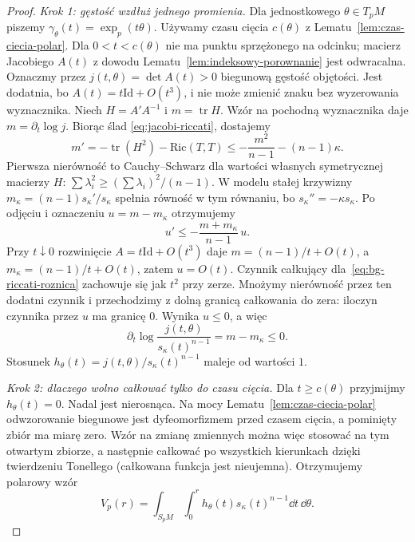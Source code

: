 \begin{proof}
\emph{Krok 1: gęstość wzdłuż jednego promienia.}
Dla jednostkowego $\theta\in T_pM$ piszemy
$\gamma_\theta(t)=\exp_p(t\theta)$.
Używamy czasu cięcia $c(\theta)$ z
Lematu~\ref{lem:czas-ciecia-polar}. Dla $0<t<c(\theta)$ nie ma punktu
sprzężonego na odcinku; macierz Jacobiego
$A(t)$ z dowodu Lematu~\ref{lem:indeksowy-porownanie}
jest odwracalna. Oznaczmy przez
$j(t,\theta)=\det A(t)>0$ biegunową gęstość
objętości. Jest dodatnia, bo
$A(t)=t\mathrm{Id}+O(t^3)$, i nie może zmienić
znaku bez wyzerowania wyznacznika.
Niech $H=A'A^{-1}$ i $m=\operatorname{tr}H$.
Wzór na pochodną wyznacznika daje
$m=\partial_t\log j$. Biorąc ślad
\eqref{eq:jacobi-riccati}, dostajemy
\[
 m'=-\operatorname{tr}(H^2)-\mathrm{Ric}(T,T)
 \leq-\frac{m^2}{n-1}-(n-1)\kappa.
\]
Pierwsza nierówność to Cauchy--Schwarz
dla wartości własnych symetrycznej macierzy $H$:
$\sum\lambda_i^2\geq(\sum\lambda_i)^2/(n-1)$.
W modelu stałej krzywizny
$m_\kappa=(n-1)s_\kappa'/s_\kappa$
spełnia równość w tym równaniu, bo
$s_\kappa''=-\kappa s_\kappa$.
Po odjęciu i oznaczeniu $u=m-m_\kappa$
otrzymujemy
\begin{equation}\label{eq:bg-riccati-roznica}
 u'\leq-\frac{m+m_\kappa}{n-1}\,u.
\end{equation}
Przy $t\downarrow0$ rozwinięcie
$A=t\mathrm{Id}+O(t^3)$ daje
$m=(n-1)/t+O(t)$, a
$m_\kappa=(n-1)/t+O(t)$, zatem $u=O(t)$.
Czynnik całkujący dla~\eqref{eq:bg-riccati-roznica}
zachowuje się jak $t^2$ przy zerze.
Mnożymy nierówność przez ten dodatni czynnik
i przechodzimy z dolną granicą całkowania
do zera: iloczyn czynnika przez $u$
ma granicę $0$. Wynika $u\leq0$, a więc
\[
 \partial_t\log\frac{j(t,\theta)}
               {s_\kappa(t)^{n-1}}
 =m-m_\kappa\leq0.
\]
Stosunek $h_\theta(t)=j(t,\theta)/
s_\kappa(t)^{n-1}$ maleje od wartości $1$.

\emph{Krok 2: dlaczego wolno całkować tylko do
czasu cięcia.} Dla $t\geq c(\theta)$
przyjmijmy $h_\theta(t)=0$. Nadal jest
nierosnąca. Na mocy Lematu~\ref{lem:czas-ciecia-polar} odwzorowanie
biegunowe jest dyfeomorfizmem przed czasem cięcia,
a pominięty zbiór ma miarę zero. Wzór na zmianę
zmiennych można więc stosować na tym otwartym zbiorze,
a następnie całkować po wszystkich kierunkach dzięki
twierdzeniu Tonellego (całkowana funkcja jest nieujemna).
Otrzymujemy polarowy wzór
\begin{equation}\label{eq:bg-polar-objetosc}
 V_p(r)=\int_{S_pM}\int_0^r
      h_\theta(t)s_\kappa(t)^{n-1}
                  \dd t\,\dd\theta.
\end{equation}


\end{proof}
